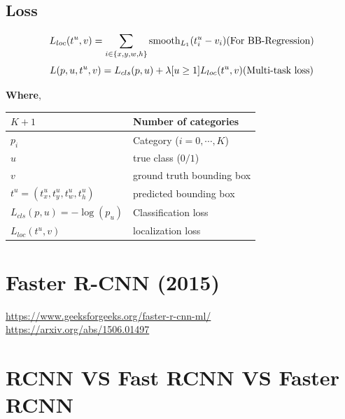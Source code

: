 \subsection*{Loss}
\[
    \displaystyle
    L_{loc}(t^u, v) = \sum_{i \in \{x,y,w,h\}} \operatorname{smooth}_{L_1}(t_i^u - v_i)
    \hfill
    \text{(For BB-Regression)}
\]
\[
    \displaystyle
    L(p,u,t^u,v) = L_{cls}(p,u) + \lambda[u\geq 1]L_{loc}(t^u, v)
    \hfill
    (\text{Multi-task loss})
\]

\noindent \textbf{Where},
\begin{table}[h]
    \begin{tabular}{l l}
        $K+1$ & Number of categories \\ \hline

        $p_i$ & Category ($i=0,\cdots,K$) \\
        $u$ & true class ($0/1$) \\ \hline

        $v$ & ground truth bounding box \\
        $t^u = (t^u_x,t^u_y,t^u_w,t^u_h)$ & predicted bounding box \\ \hline

        $L_{cls}(p,u) = -\log(p_u)$ & Classification loss \\
        $L_{loc}(t^u,v)$ & localization loss \\
    \end{tabular}
\end{table}


\section{Faster R-CNN (2015) \cite{arxiv/1506.01497-faster-rcnn,gfg/faster-r-cnn-ml}}\label{Faster R-CNN}

\url{https://www.geeksforgeeks.org/faster-r-cnn-ml/}\\
\url{https://arxiv.org/abs/1506.01497}


\section{RCNN VS Fast RCNN VS Faster RCNN}

